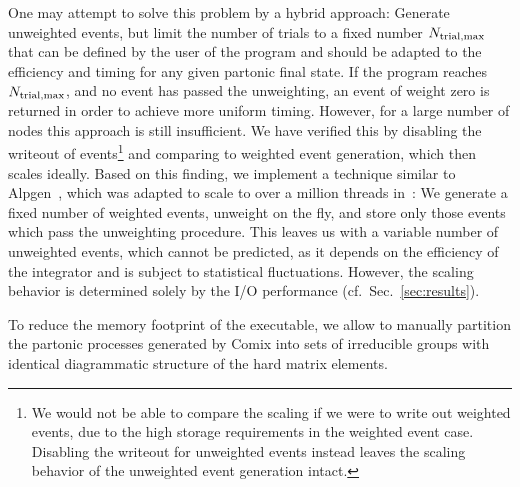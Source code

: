 \documentclass[aps,prd,twocolumn,fleqn,superscriptaddress,groupedaddress,nofootinbib,preprintnumbers]{revtex4}
\begin{document}
One may attempt to solve this problem by a hybrid approach:
Generate unweighted events, but limit the number of trials
to a fixed number $N_{\rm trial,max}$ that can be defined by the user
of the program and should be adapted to the efficiency and timing
for any given partonic final state. If the program reaches
$N_{\rm trial,max}$, and no event has passed the unweighting,
an event of weight zero is returned in order to achieve more
uniform timing. However, for a large number of nodes this approach
is still insufficient. We have verified this by disabling
the writeout of events\footnote{
  We would not be able to compare the scaling if we were to write out
  weighted events, due to the high storage requirements in the weighted
  event case. Disabling the writeout for unweighted events instead leaves
  the scaling behavior of the unweighted event generation intact.}
and comparing to weighted event generation, which then scales ideally.
Based on this finding, we implement a technique similar to Alpgen~\cite{Mangano:2002ea},
which was adapted to scale to over a million threads in~\cite{Childers:2015tyv}:
We generate a fixed number of weighted events, unweight on the fly,
and store only those events which pass the unweighting procedure.
This leaves us with a variable number of unweighted events, which cannot
be predicted, as it depends on the efficiency of the integrator and
is subject to statistical fluctuations. However, the scaling behavior
is determined solely by the I/O performance (cf.\ Sec.~\ref{sec:results}).

To reduce the memory footprint of the executable, we allow to manually
partition the partonic processes generated by Comix into sets of
irreducible groups with identical diagrammatic structure of the
hard matrix elements.
\end{document}
